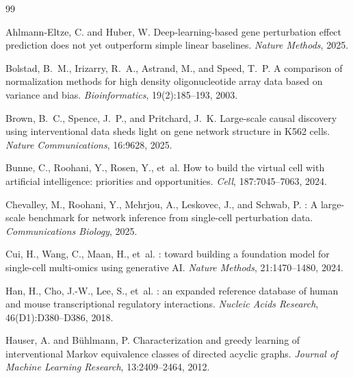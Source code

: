\documentclass{article}
\theoremstyle{plain}
\theoremstyle{definition}
\theoremstyle{remark}
\begin{document}

\begin{thebibliography}{99}

Ahlmann-Eltze, C. and Huber, W.
\newblock Deep-learning-based gene perturbation effect prediction does not yet outperform simple linear baselines.
\newblock \emph{Nature Methods}, 2025.

Bolstad, B.~M., Irizarry, R.~A., Astrand, M., and Speed, T.~P.
\newblock A comparison of normalization methods for high density oligonucleotide array data based on variance and bias.
\newblock \emph{Bioinformatics}, 19(2):185--193, 2003.

Brown, B.~C., Spence, J.~P., and Pritchard, J.~K.
\newblock Large-scale causal discovery using interventional data sheds light on gene network structure in {K}562 cells.
\newblock \emph{Nature Communications}, 16:9628, 2025.

Bunne, C., Roohani, Y., Rosen, Y., et~al.
\newblock How to build the virtual cell with artificial intelligence: priorities and opportunities.
\newblock \emph{Cell}, 187:7045--7063, 2024.

Chevalley, M., Roohani, Y., Mehrjou, A., Leskovec, J., and Schwab, P.
: A large-scale benchmark for network inference from single-cell perturbation data.
\newblock \emph{Communications Biology}, 2025.

Cui, H., Wang, C., Maan, H., et~al.
: toward building a foundation model for single-cell multi-omics using generative {AI}.
\newblock \emph{Nature Methods}, 21:1470--1480, 2024.

Han, H., Cho, J.-W., Lee, S., et~al.
: an expanded reference database of human and mouse transcriptional regulatory interactions.
\newblock \emph{Nucleic Acids Research}, 46(D1):D380--D386, 2018.

Hauser, A. and B{\"u}hlmann, P.
\newblock Characterization and greedy learning of interventional {Markov} equivalence classes of directed acyclic graphs.
\newblock \emph{Journal of Machine Learning Research}, 13:2409--2464, 2012.


\end{thebibliography}
\end{document}
